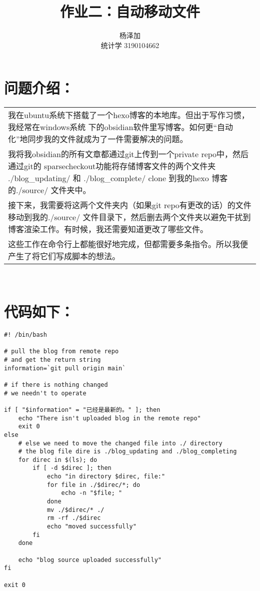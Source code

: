 \documentclass{ctexart}
\title{作业二：自动移动文件}
\author{杨泽加 \\ 统计学 3190104662}
\begin{document}
    \maketitle


    \section{问题介绍：}
    \begin{tabular}{p{\columnwidth}}
        我在ubuntu系统下搭载了一个hexo博客的本地库。但出于写作习惯，我经常在windows系统
        下的obsidian软件里写博客。如何更“自动化”地同步我的文件就成为了一件需要解决的问题。     \\
        我将我obsidian的所有文章都通过git上传到一个private repo中，然后通过git的
        sparsecheckout功能将存储博客文件的两个文件夹 ./blog\_updating/ 和
        ./blog\_complete/ clone 到我的hexo 博客的./source/ 文件夹中。 \\
        接下来，我需要将这两个文件夹内（如果git repo有更改的话）的文件移动到我的./source/
        文件目录下，然后删去两个文件夹以避免干扰到博客渲染工作。有时候，我还需要知道更改了哪些文件。     \\
        这些工作在命令行上都能很好地完成，但都需要多条指令。所以我便产生了将它们写成脚本的想法。
    \end{tabular}\\


    \section{代码如下：}
    \begin{lstlisting}
#! /bin/bash

# pull the blog from remote repo
# and get the return string
information=`git pull origin main`

# if there is nothing changed
# we needn't to operate

if [ "$information" = "已经是最新的。" ]; then
    echo "There isn't uploaded blog in the remote repo"
    exit 0
else
    # else we need to move the changed file into ./ directory
    # the blog file dire is ./blog_updating and ./blog_completing
    for direc in $(ls); do
        if [ -d $direc ]; then
            echo "in directory $direc, file:"
            for file in ./$direc/*; do
                echo -n "$file; "
            done
            mv ./$direc/* ./
            rm -rf ./$direc
            echo "moved successfully"
        fi
    done

    echo "blog source uploaded successfully"
fi

exit 0
    \end{lstlisting}
\end{document}
